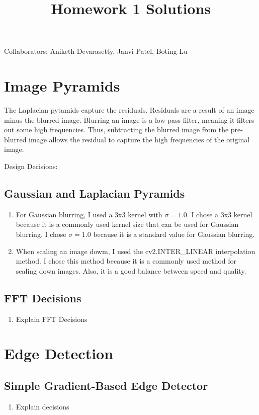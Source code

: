\documentclass[12pt]{article}
\begin{document}
\title{Homework 1 Solutions}

Collaborators: Aniketh Devarasetty, Janvi Patel, Boting Lu

\section{Image Pyramids}

The Laplacian pytamids capture the residuals. Residuals are a result of an image minus the blurred image. Blurring an image is a low-pass filter, meaning it filters out some high frequencies. Thus, subtracting the blurred image from the pre-blurred image allows the residual to capture the high frequencies of the original image.

Design Decisions:
\subsection{Gaussian and Laplacian Pyramids}
\begin{enumerate}
    \item For Gaussian blurring, I used a 3x3 kernel with $\sigma = 1.0$. I chose a 3x3 kernel because it is a commonly used kernel size that can be used for Gaussian blurring. I chose $\sigma = 1.0$ because it is a standard value for Gaussian blurring.
    \item When scaling an image dowm, I used the cv2.INTER\_LINEAR interpolation method. I chose this method because it is a commonly used method for scaling down images. Also, it is a good balance between speed and quality.
\end{enumerate}

\subsection{FFT Decisions}
\begin{enumerate}
    \item Explain FFT Decisions
\end{enumerate}


\section{Edge Detection}

\subsection{Simple Gradient-Based Edge Detector}
\begin{enumerate}
    \item Explain decisions
\end{enumerate}
\end{document}
